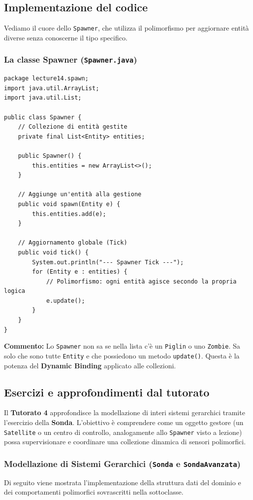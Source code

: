 \documentclass[12pt, a4paper]{article}
\begin{document}
\newpage

\subsection{Implementazione del codice}
Vediamo il cuore dello \texttt{Spawner}, che utilizza il polimorfismo per aggiornare entità diverse senza conoscerne il tipo specifico.

\subsubsection{La classe Spawner (\texttt{Spawner.java})}
\begin{verbatim}
package lecture14.spawn;
import java.util.ArrayList;
import java.util.List;

public class Spawner {
    // Collezione di entità gestite
    private final List<Entity> entities;

    public Spawner() {
        this.entities = new ArrayList<>();
    }

    // Aggiunge un'entità alla gestione
    public void spawn(Entity e) {
        this.entities.add(e);
    }

    // Aggiornamento globale (Tick)
    public void tick() {
        System.out.println("--- Spawner Tick ---");
        for (Entity e : entities) {
            // Polimorfismo: ogni entità agisce secondo la propria logica
            e.update(); 
        }
    }
}
\end{verbatim}
\textbf{Commento:} Lo \texttt{Spawner} non sa se nella lista c'è un \texttt{Piglin} o uno \texttt{Zombie}. Sa solo che sono tutte \texttt{Entity} e che possiedono un metodo \texttt{update()}. Questa è la potenza del \textbf{Dynamic Binding} applicato alle collezioni.
\subsection{Esercizi e approfondimenti dal tutorato}
Il \textbf{Tutorato 4} approfondisce la modellazione di interi sistemi gerarchici tramite l'esercizio della \textbf{Sonda}. L'obiettivo è comprendere come un oggetto gestore (un \texttt{Satellite} o un centro di controllo, analogamente allo \texttt{Spawner} visto a lezione) possa supervisionare e coordinare una collezione dinamica di sensori polimorfici.

\newpage

\subsubsection{Modellazione di Sistemi Gerarchici (\texttt{Sonda} e \texttt{SondaAvanzata})}
Di seguito viene mostrata l'implementazione della struttura dati del dominio e dei comportamenti polimorfici sovrascritti nella sottoclasse.
\end{document}
